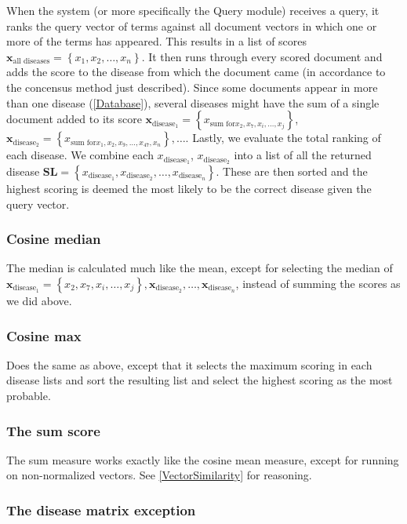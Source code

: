 When the system (or more specifically the Query module) receives a
query, it ranks the query vector of terms against all document vectors
in which one or more of the terms has appeared. This results in a list
of scores $\mathbf{x}_{\textrm{all diseases}} = \left\{x_1, x_2,
\dots, x_n \right\}$. It then runs through every scored document and
adds the score to the disease from which the document came (in
accordance to the concensus method just described). Since some
documents appear in more than one disease (\ref{Database}), several
diseases might have the sum of a single document added to its score
$\mathbf{x}_{\textrm{disease}_{1}} = \left\{x_{\textrm{sum for} x_2,
  x_7, x_i, \dots, x_j}\right\}$, $\mathbf{x}_{\textrm{disease}_{2}} =
\left\{x_{\textrm{sum for} x_1, x_2, x_9, \dots, x_47, x_n}\right\},
\dots$.  Lastly, we evaluate the total ranking of each disease. We
combine each $x_{\textrm{disease}_1}$, $x_{\textrm{disease}_2}$ into a
list of all the returned disease $\mathbf{SL} =
\left\{x_{\textrm{disease}_1},x_{\textrm{disease}_2}, \dots,
x_{\textrm{disease}_n}\right\}$. These are then sorted and the highest
scoring is deemed the most likely to be the correct disease given the
query vector.

\subsubsection{Cosine median}
The median is calculated much like the mean, except for selecting the
median of $\mathbf{x}_{\textrm{disease}_{1}} = \left\{x_2,x_7, x_i,
\dots, x_j\right\}, \mathbf{x}_{\textrm{disease}_{2}}, \dots,
\mathbf{x}_{\textrm{disease}_{n}}$, instead of summing the scores as
we did above.

\subsubsection{Cosine max}
Does the same as above, except that it selects the maximum scoring in each
disease lists and sort the resulting list and select the highest
scoring as the most probable.

\subsubsection{The sum score}

The sum measure works exactly like the cosine mean measure, except for
running on non-normalized vectors. See \ref{VectorSimilarity} for
reasoning.

\subsubsection{The disease matrix exception}

